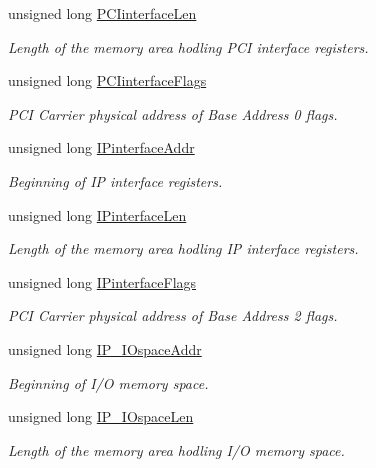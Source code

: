 \begin{CompactItemize}
unsigned long \hyperlink{structnpscip___dev_0142cc27edac10b4f03fecc945baceaa}{PCIinterfaceLen}
\begin{CompactList}\small\item\em Length of the memory area hodling PCI interface registers. \item\end{CompactList}\item 
unsigned long \hyperlink{structnpscip___dev_638e1740312817476855046b6fb3bd1a}{PCIinterfaceFlags}
\begin{CompactList}\small\item\em PCI Carrier physical address of Base Address 0 flags. \item\end{CompactList}\item 
unsigned long \hyperlink{structnpscip___dev_f2580a0984d58cf0423092bc9fe9d137}{IPinterfaceAddr}
\begin{CompactList}\small\item\em Beginning of IP interface registers. \item\end{CompactList}\item 
unsigned long \hyperlink{structnpscip___dev_746b6f405b829de9bc181a7cc628f5d9}{IPinterfaceLen}
\begin{CompactList}\small\item\em Length of the memory area hodling IP interface registers. \item\end{CompactList}\item 
unsigned long \hyperlink{structnpscip___dev_0ff404840e5bbfed8506602e516f83cb}{IPinterfaceFlags}
\begin{CompactList}\small\item\em PCI Carrier physical address of Base Address 2 flags. \item\end{CompactList}\item 
unsigned long \hyperlink{structnpscip___dev_6e53454785de7b34c1cff8030768df82}{IP\_\-IOspaceAddr}
\begin{CompactList}\small\item\em Beginning of I/O memory space. \item\end{CompactList}\item 
unsigned long \hyperlink{structnpscip___dev_8f1859f1a65f449d6c9fde8a226009a2}{IP\_\-IOspaceLen}
\begin{CompactList}\small\item\em Length of the memory area hodling I/O memory space. \item\end{CompactList}\item 

\end{CompactItemize}
